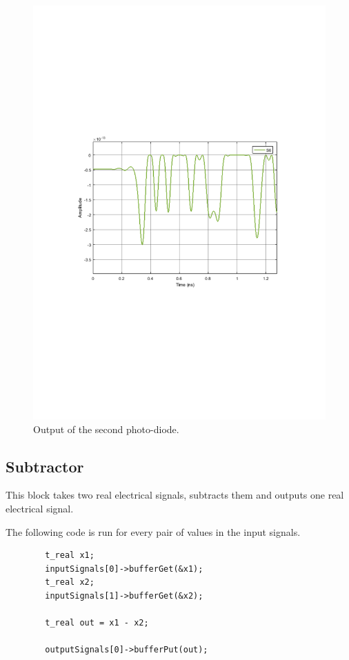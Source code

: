 \documentclass{article}
\begin{document}
\begin{figure}[H]
\centering
\includegraphics[width=\linewidth, trim= 0mm 100mm 0mm 100mm, clip]{photod2.pdf}
\caption{Output of the second photo-diode.}
\label{fig:photod2}
\end{figure}


\subsection{Subtractor}

This block takes two real electrical signals, subtracts them and outputs one real electrical signal.
\par
The following code is run for every pair of values in the input signals.


\begin{verbatim}
		t_real x1;
		inputSignals[0]->bufferGet(&x1);
		t_real x2;
		inputSignals[1]->bufferGet(&x2);

		t_real out = x1 - x2;

		outputSignals[0]->bufferPut(out);
\end{verbatim}
\end{document}
